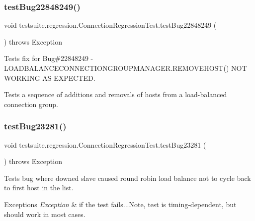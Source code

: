 \subsubsection{\texorpdfstring{test\+Bug22848249()}{testBug22848249()}}
{\footnotesize\ttfamily void testsuite.\+regression.\+Connection\+Regression\+Test.\+test\+Bug22848249 (\begin{DoxyParamCaption}{ }\end{DoxyParamCaption}) throws Exception}

Tests fix for Bug\#22848249 -\/ L\+O\+A\+D\+B\+A\+L\+A\+N\+C\+E\+C\+O\+N\+N\+E\+C\+T\+I\+O\+N\+G\+R\+O\+U\+P\+M\+A\+N\+A\+G\+E\+R.\+R\+E\+M\+O\+V\+E\+H\+O\+S\+T() N\+OT W\+O\+R\+K\+I\+NG AS E\+X\+P\+E\+C\+T\+ED.

Tests a sequence of additions and removals of hosts from a load-\/balanced connection group. \mbox{\label{classtestsuite_1_1regression_1_1_connection_regression_test_a677e7bbd5b69eecc56a23dab94b43440}} 
\subsubsection{\texorpdfstring{test\+Bug23281()}{testBug23281()}}
{\footnotesize\ttfamily void testsuite.\+regression.\+Connection\+Regression\+Test.\+test\+Bug23281 (\begin{DoxyParamCaption}{ }\end{DoxyParamCaption}) throws Exception}

Tests bug where downed slave caused round robin load balance not to cycle back to first host in the list.


\begin{DoxyExceptions}{Exceptions}
{\em Exception} & if the test fails...Note, test is timing-\/dependent, but should work in most cases. \\
\hline
\end{DoxyExceptions}
\mbox{\label{classtestsuite_1_1regression_1_1_connection_regression_test_a0fda786f7ab6f9338c7dd469a8e617fa}} 
